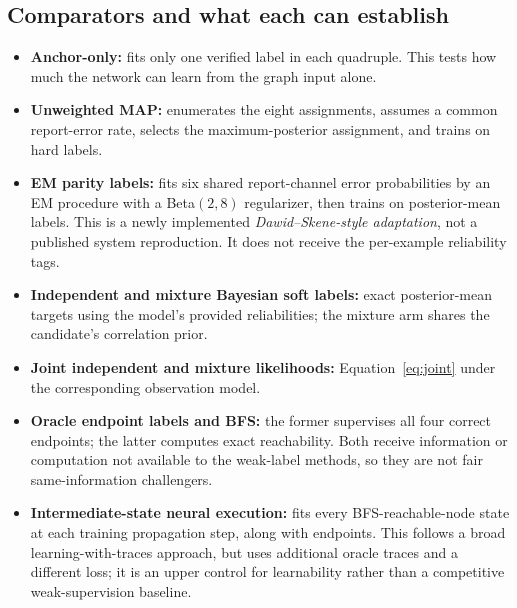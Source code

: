 \documentclass[10pt]{article}
\begin{document}
\subsection{Comparators and what each can establish}
\begin{itemize}
\item \textbf{Anchor-only:} fits only one verified label in each quadruple. This tests how much the network can learn from the graph input alone.
\item \textbf{Unweighted MAP:} enumerates the eight assignments, assumes a common report-error rate, selects the maximum-posterior assignment, and trains on hard labels.
\item \textbf{EM parity labels:} fits six shared report-channel error probabilities by an EM procedure with a Beta$(2,8)$ regularizer, then trains on posterior-mean labels. This is a newly implemented \emph{Dawid--Skene-style adaptation}, not a published system reproduction. It does not receive the per-example reliability tags.
\item \textbf{Independent and mixture Bayesian soft labels:} exact posterior-mean targets using the model's provided reliabilities; the mixture arm shares the candidate's correlation prior.
\item \textbf{Joint independent and mixture likelihoods:} Equation~\ref{eq:joint} under the corresponding observation model.
\item \textbf{Oracle endpoint labels and BFS:} the former supervises all four correct endpoints; the latter computes exact reachability. Both receive information or computation not available to the weak-label methods, so they are not fair same-information challengers.
\item \textbf{Intermediate-state neural execution:} fits every BFS-reachable-node state at each training propagation step, along with endpoints. This follows a broad learning-with-traces approach, but uses additional oracle traces and a different loss; it is an upper control for learnability rather than a competitive weak-supervision baseline.
\end{itemize}
\end{document}
